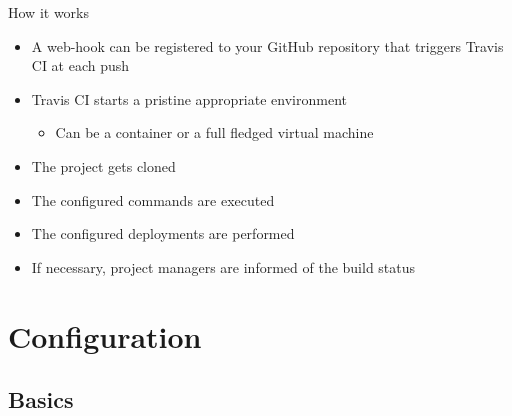\documentclass[presentation]{beamer}
\begin{document}
\begin{frame}[fragile]{How it works}
	\begin{itemize}
		\item A web-hook can be registered to your GitHub repository that triggers Travis CI at each push
		\item Travis CI starts a pristine appropriate environment
		\begin{itemize}
			\item Can be a container or a full fledged virtual machine
		\end{itemize}
		\item The project gets cloned
		\item The configured commands are executed
		\item The configured deployments are performed
		\item If necessary, project managers are informed of the build status
	\end{itemize}
\end{frame}

\section{Configuration}

\subsection{Basics}
\end{document}
